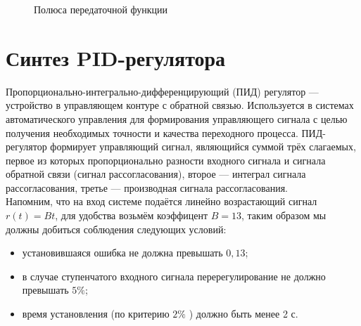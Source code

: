 \documentclass[12pt, a4paper]{report}
\theoremstyle{definition}
\theoremstyle{plain}
\theoremstyle{remark}
\theoremstyle{remark}
\theoremstyle{definition}
\begin{document}
 \begin{figure}[h!]
    \caption{Полюса передаточной функции}
\end{figure}

\section{Синтез PID-регулятора}
Пропорционально-интегрально-дифференцирующий (ПИД) регулятор —
устройство в управляющем контуре с обратной связью. Используется в
системах автоматического управления для формирования управляющего
сигнала с целью получения необходимых точности и качества переходного
процесса. ПИД-регулятор формирует управляющий сигнал, являющийся
суммой трёх слагаемых, первое из которых пропорционально разности
входного сигнала и сигнала обратной связи (сигнал рассогласования), второе
— интеграл сигнала рассогласования, третье — производная сигнала
рассогласования.\\
Напомним, что на вход системе подаётся линейно возрастающий сигнал $r(t)=Bt$, для удобства возьмём коэффицент 
$B=13$, таким образом мы должны добиться соблюдения следующих условий:\\
\begin{itemize}
  \item установившаяся ошибка не должна превышать $0,13$;
  \item в случае ступенчатого входного сигнала перерегулирование не должно превышать $5\%$;
  \item  время установления (по критерию $2\%$ ) должно быть менее 2 с.
\end{itemize}
\end{document}
